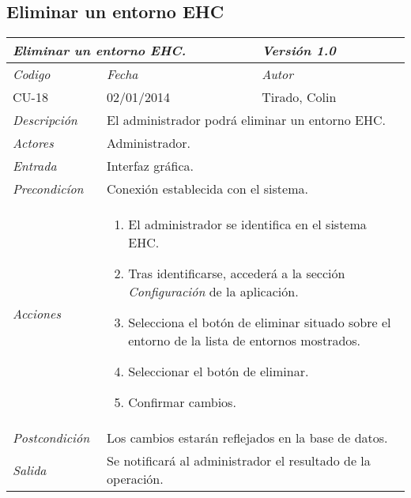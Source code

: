 \subsection{Eliminar un entorno EHC}
\begin{center}
    \begin{tabular}{|p{3cm}|p{4cm}|p{4cm}|p{4cm}|}
    \hline \multicolumn{3}{|p{9cm}|}{\textit{Eliminar un entorno EHC.}} & \textit{Versi\'on 1.0} \\
	\hline \textit{Codigo} & \textit{Fecha} & \multicolumn{2}{|p{6cm}|}{\textit{Autor}} \\
	CU-18 & 02/01/2014 & \multicolumn{2}{|p{6cm}|}{Tirado, Colin} \\		
    \hline \textit{Descripci\'on} & \multicolumn{3}{|p{9cm}|}{El administrador podr\'a eliminar un entorno EHC.} \\
    \hline \textit{Actores} & \multicolumn{3}{|p{9cm}|}{Administrador.} \\
    \hline \textit{Entrada} & \multicolumn{3}{|p{9cm}|}{Interfaz gr\'afica.} \\
    \hline \textit{Precondic\'ion} & \multicolumn{3}{|p{9cm}|}{Conexi\'on establecida con el sistema.} \\
    \hline \textit{Acciones} & \multicolumn{3}{|p{9cm}|}{
        \begin{enumerate}
        \item El administrador se identifica en el sistema EHC.
        \item Tras identificarse, acceder\'a a la secci\'on \textit{Configuraci\'on} de la aplicaci\'on.
        \item Selecciona el bot\'on de eliminar situado sobre el entorno de la lista de entornos mostrados.
        \item Seleccionar el bot\'on de eliminar.
        \item Confirmar cambios.
        \end{enumerate}
           } \\
    \hline \textit{Postcondici\'on} & \multicolumn{3}{|p{9cm}|}{Los cambios estar\'an reflejados en la base de datos.} \\
    \hline \textit{Salida} & \multicolumn{3}{|p{9cm}|}{Se notificar\'a al administrador el resultado de la operaci\'on.} \\ \hline
    \end{tabular}
\end{center}
